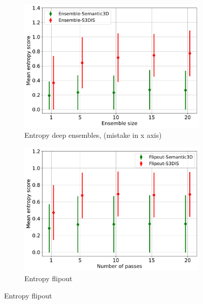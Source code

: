     \begin{figure}[!ht]
        \centering
        \begin{subfigure}{0.98\textwidth}
        \includegraphics[scale=0.6]{images/MSP/Ensembles_ENT_semvs3d.pdf}
        \caption{Entropy deep ensembles, (mistake in x axis)}
        \label{fig:ent_ensembles}
        \end{subfigure}
        \begin{subfigure}{0.98\textwidth}
        \includegraphics[scale=0.6]{images/MSP/Flipout_ENT_semvs3d.pdf}
        \caption{Entropy flipout}
        \label{fig:ent_flipout}
        \end{subfigure}
    \end{figure}
